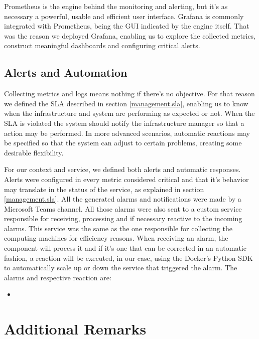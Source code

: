 \documentclass[12pt]{article}
\begin{document}
Prometheus is the engine behind the monitoring and alerting, but it's as necessary a powerful, usable and efficient user interface. Grafana is commonly integrated with Prometheus, being the GUI indicated by the engine itself. That was the reason we deployed Grafana, enabling us to explore the collected metrics, construct meaningful dashboards and configuring critical alerts.

\subsection{Alerts and Automation} \label{management.automation} %

Collecting metrics and logs means nothing if there's no objective. For that reason we defined the SLA described in section \ref{management.sla}, enabling us to know when the infrastructure and system are performing as expected or not. When the SLA is violated the system should notify the infrastructure manager so that a action may be performed. In more advanced scenarios, automatic reactions may be specified so that the system can adjust to certain problems, creating some desirable flexibility.

For our context and service, we defined both alerts and automatic responses. Alerts were configured in every metric considered critical and that it's behavior may translate in the status of the service, as explained in section \ref{management.sla}. All the generated alarms and notifications were made by a Microsoft Teams channel. All those alarms were also sent to a custom service responsible for receiving, processing and if necessary reactive to the incoming alarms. This service was the same as the one responsible for collecting the computing machines for efficiency reasons. When receiving an alarm, the component will process it and if it's one that can be corrected in an automatic fashion, a reaction will be executed, in our case, using the Docker's Python SDK to automatically scale up or down the service that triggered the alarm. The alarms and respective reaction are:

\begin{itemize}
  \item
\end{itemize}

\newpage
\section{Additional Remarks} \label{remarks} %
\end{document}

